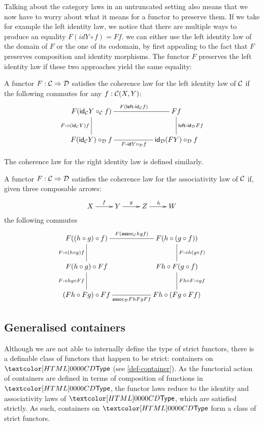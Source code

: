 Talking about the category laws in an untruncated setting also means
that we now have to worry about what it means for a functor to
preserve them. If we take for example the left identity law, we notice
that there are multiple ways to produce an equality
$F (id Y \circ f) = F f$. we can either use the left identity law of
the domain of $F$ or the one of its codomain, by first appealing to
the fact that $F$ preserves composition and identity morphisms. The
functor $F$ preserves the left identity law if these two approaches
yield the same equality:

\begin{definition}
  A functor $F : \mathcal{C} \Rightarrow \mathcal{D}$ satisfies the coherence law for the
  left identity law of $\mathcal{C}$ if the following commutes for any $f : \mathcal{C}(X,Y)$:
  $$
  \xymatrix{
    F (\id_{\Cc} Y \circ_{\Cc} f) \ar@{-}[rr]^{F (\leftid_{\Cc} f)} \ar@{-}[d]_{\Fcomp (\id_{\Cc} Y) f} &&F f \ar@{-}[d]^{\leftid_{\Dd} F f} \\
    F (\id_{\Cc} Y) \circ_{\Dd} f \ar@{-}[rr]_{\Fid Y \circ_{\Dd} f} &&\id_{\Dd} (F Y) \circ_{\Dd} f
  }
  $$  
\end{definition}

The coherence law for the right identity law is defined similarly.

\begin{definition}
  A functor $F : \mathcal{C} \Rightarrow \mathcal{D}$ satisfies the coherence law for the
  associativity law of $\mathcal{C}$ if, given three composable arrows:
  $$
  \xymatrix{
    X \ar[r]^{f} &Y \ar[r]^{g} &Z \ar[r]^{h} &W
  }
  $$
  the following commutes
  $$
  \xymatrix{
    F ((h \circ g) \circ f) \ar@{-}[rr]^{F (\assoc_{\Cc} h g f)} \ar@{-}[d]_{\Fcomp (h \circ g) f} &&F (h \circ (g \circ f)) \ar@{-}[d]^{\Fcomp h (g \circ f)} \\
    F (h \circ g) \circ F f \ar@{-}[d]_{\Fcomp h g \circ F f} &&F h \circ F (g \circ f) \ar@{-}[d]^{F h \circ \Fcomp g f} \\
    (F h \circ F g) \circ F f  \ar@{-}[rr]_{\assoc_{\Dd} Fh Fg Ff} && F h \circ (F g \circ F f)
  }
  $$
\end{definition}

\subsection{Generalised containers}

Although we are not able to internally define the type of strict
functors, there is a definable class of functors that happen to be
strict: containers on $\Type$ (see \cref{def-container}). As the
functorial action of containers are defined in terms of composition of
functions in $\Type$, the functor laws reduce to the identity and
associativity laws of $\Type$, which are satisfied strictly. As such,
containers on $\Type$ form a class of strict functors.

